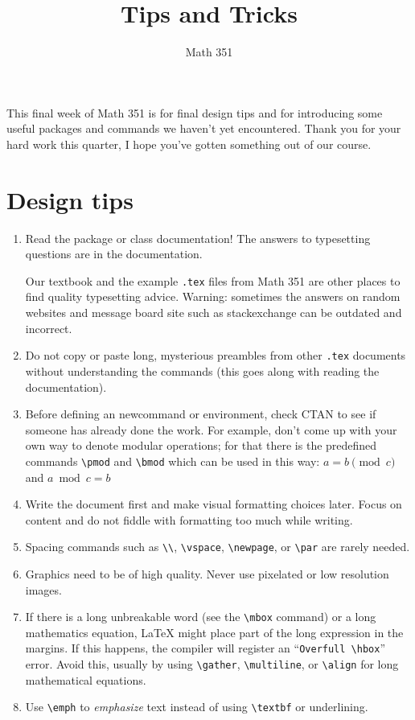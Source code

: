 \documentclass[12pt]{paper}
\title{Tips and Tricks}
\author{Math 351}
\date{}
\begin{document}
\maketitle

This final week of Math 351 is for final design tips and for introducing some useful packages and
commands we haven't yet encountered.  Thank you for your hard work this quarter, I hope
you've gotten something out of our course.

\section{Design tips}

\begin{enumerate}

\item Read the package or class documentation!  The answers to typesetting
  questions are in the documentation.

  Our textbook and the example \verb~.tex~ files from Math 351 are other places to find quality
  typesetting advice.  Warning: sometimes the answers on random websites and message board site
  such as stackexchange can be outdated and incorrect.

\item Do not copy or paste long, mysterious preambles from other \verb~.tex~ documents without
  understanding the commands (this goes along with reading the documentation).

\item Before defining an newcommand or environment, check CTAN to see if someone has already
  done the work.  For example, don't come up with your own way to denote modular operations; for
  that there is the predefined commands \verb~\pmod~ and \verb~\bmod~ which can be used in this
  way: $a = b \pmod c$ and $a\bmod c = b$
  
\item Write the document first and make visual formatting choices later.  Focus on content and do not
  fiddle with formatting too much while writing.

\item Spacing commands such as \verb~\\~, \verb~\vspace~, \verb~\newpage~, or \verb~\par~ are
  rarely needed.
  
\item Graphics need to be of high quality.  Never use pixelated or low resolution images.  
  
\item If there is a long unbreakable word (see the \verb~\mbox~ command) or a long
  mathematics equation, \LaTeX{} might place part of the long expression in the margins.
  If this happens, the compiler will register an ``\verb~Overfull \hbox~'' error.
  Avoid this, usually by using \verb~\gather~, \verb~\multiline~, or \verb~\align~ for
  long mathematical equations.

\item Use \verb~\emph~ to \emph{emphasize} text instead of using \verb~\textbf~ or underlining.

\end{enumerate}
\end{document}
